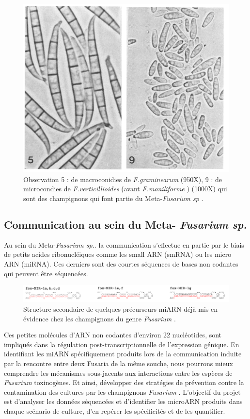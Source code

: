 \begin{figure}
    \centering
    \includegraphics[width=.40\textwidth]{img/fig_2.png}
    \caption{Observation 5 : de macroconidies de \textit{F.graminearum} (950X), 9 : de microcondies de \textit{F.verticillioides} (avant \textit{F.moniliforme} \cite{name}) (1000X) qui sont des champignons qui font partie du Meta-\textit{Fusarium sp} \cite{taxonomy}.}
    \label{fig:fusa}
\end{figure}

\subsection{Communication au sein du Meta-
\textit{Fusarium sp.}}
Au sein du Meta-\textit{Fusarium sp.}. la communication s’effectue en partie par le biais de petits acides ribonucléiques comme les small ARN (smRNA) ou les micro ARN (miRNA). Ces derniers sont des courtes séquences de bases non codantes qui peuvent être séquencées.\\

\begin{figure}[h]
    \centering
    \includegraphics[width=1\textwidth]{img/fig_3.png}
    \caption{Structure secondaire de quelques précurseurs miARN déjà mis en évidence chez les champignons du genre \textit{Fusarium} \cite{chen2014exploring}.}
    \label{fig:mirna}
\end{figure}

Ces petites molécules d'ARN non codantes d'environ 22 nucléotides, sont impliqués dans la régulation post-transcriptionnelle de l'expression génique. En identifiant les miARN spécifiquement produits lors de la communication induite par la rencontre entre deux Fusaria de la même souche, nous pourrons mieux comprendre les mécanismes sous-jacents aux interactions entre les espèces de \textit{Fusarium} toxinogènes. Et ainsi, développer des stratégies de prévention contre la contamination des cultures par les champignons \textit{Fusarium} \cite{ponts2009fusarium, mycsa}.  L’objectif du projet est d’analyser les données séquencées et d’identifier les microARN produits dans chaque scénario de culture, d’en repérer les spécificités et de les quantifier.

